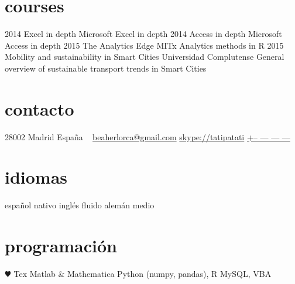 \documentclass[]{friggeri-cv}
\begin{document}
\section{courses}

\begin{entrylist}
  \entry
    {2014}
    {Excel in depth}
    {}
    {Microsoft Excel in depth}
  \entry
    {2014}
    {Access in depth}
    {}
    {Microsoft Access in depth}
  \entry
    {2015}
    {The Analytics Edge}
    {MITx}
    {Analytics methods in R}
  \entry
    {2015}
    {Mobility and sustainability in Smart Cities}
    {Universidad Complutense}
    {General overview of sustainable transport trends in Smart Cities}
\end{entrylist}




\else 

       {}


\begin{aside}
  \section{contacto}
    28002 Madrid
    España
    ~
    \href{mailto:beaherlorca@gmail.com}{beaherlorca@gmail.com}
    \href{skype:<tatipatati>[add]}{skype://tatipatati}
    \href{tel:xxxxxxxxxxx}{+-- --- --- ---}
  \section{idiomas}
    español nativo
    inglés fluido
    alemán medio
  \section{programación}
    {\color{red} $\varheartsuit$} Tex
    Matlab \& Mathematica
    Python (numpy, pandas), R
    MySQL, VBA
\end{aside}
\end{document}
